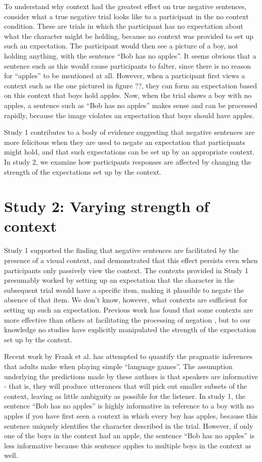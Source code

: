 \documentclass[10pt,letterpaper]{article}
\begin{document}
To understand why context had the greatest effect on true negative sentences, consider what a true negative trial looks like to a participant in the no context condition.  These are trials in which the participant has no expectation about what the character might be holding, because no context was provided to set up such an expectation.  The participant would then see a picture of a boy, not holding anything, with the sentence ``Bob has no apples''.  It seems obvious that a sentence such as this would cause participants to falter, since there is no reason for ``apples'' to be mentioned at all.  However, when a participant first views a context such as the one pictured in figure ??, they can form an expectation based on this context that boys hold apples.  Now, when the trial shows a boy with no apples, a sentence such as ``Bob has no apples'' makes sense and can be processed rapidly, because the image violates an expectation that boys should have apples.  

Study 1 contributes to a body of evidence suggesting that negative sentences are more felicitous when they are used to negate an expectation that participants might hold, and that such expectations can be set up by an appropriate context.  In study 2, we examine how participants responses are affected by changing the strength of the expectations set up by the context.  

\section{Study 2: Varying strength of context}
Study 1 supported the finding that negative sentences are facilitated by the presence of a visual context, and demonstrated that this effect persists even when participants only passively view the context.  The contexts provided in Study 1 presumably worked by setting up an expectation that the character in the subsequent trial would have a specific item, making it plausible to negate the absence of that item.  We don't know, however, what contexts are sufficient for setting up such an expectation.  Previous work has found that some contexts are more effective than others at facilitating the processing of negation \cite{ludtke2006, dale2011}, but to our knowledge no studies have explicitly manipulated the strength of the expectation set up by the context.  

Recent work by Frank et al. \cite{frank2012} has attempted to quantify the pragmatic inferences that adults make when playing simple ``language games''. The assumption underlying the predictions made by these authors is that speakers are informative - that is, they will produce utterances that will pick out smaller subsets of the context, leaving as little ambiguity as possible for the listener.  In study 1, the sentence ``Bob has no apples'' is highly informative in reference to a boy with no apples if you have first seen a context in which every boy has apples, because this sentence uniquely identifies the character described in the trial.  However, if only one of the boys in the context had an apple, the sentence ``Bob has no apples'' is less informative because this sentence applies to multiple boys in the context as well.  
\end{document}
